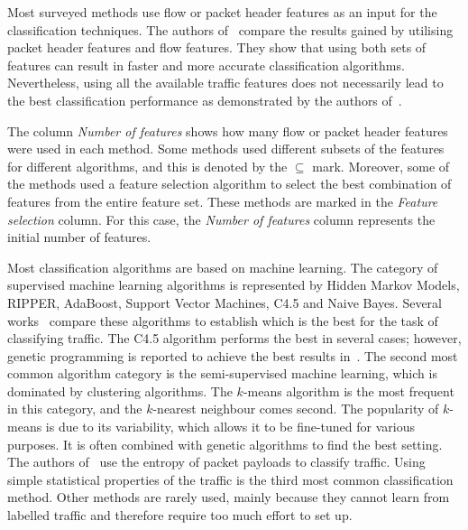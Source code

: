 Most surveyed methods use flow or packet header features as an input for the classification techniques. The authors of~\cite{Alshammari-2009-Preliminary, Alshammari-2011-Can} compare the results gained by utilising packet header features and flow features. They show that using both sets of features can result in faster and more accurate classification algorithms. Nevertheless, using all the available traffic features does not necessarily lead to the best classification performance as demonstrated by the authors of~\cite{Alshammari-2009-Classifying}.

The column \emph{Number of features} shows how many flow or packet header features were used in each method. Some methods used different subsets of the features for different algorithms, and this is denoted by the $\subseteq$ mark. Moreover, some of the methods used a feature selection algorithm to select the best combination of features from the entire feature set. These methods are marked in the \emph{Feature selection} column. For this case, the \emph{Number of features} column represents the initial number of features.

Most classification algorithms are based on machine learning. The category of supervised machine learning algorithms is represented by Hidden Markov Models, RIPPER, AdaBoost, Support Vector Machines, C4.5 and Naive Bayes. Several works~\cite{Alshammari-2007-flow, Alshammari-2009-Machine, Alshammari-2010-Investigation, Alshammari-2011-Can} compare these algorithms to establish which is the best for the task of classifying traffic. The C4.5 algorithm performs the best in several cases; however, genetic programming is reported to achieve the best results in~\cite{Alshammari-2011-Can}. The second most common algorithm category is the semi-supervised machine learning, which is dominated by clustering algorithms. The $k$-means algorithm is the most frequent in this category, and the $k$-nearest neighbour comes second. The popularity of $k$-means is due to its variability, which allows it to be fine-tuned for various purposes. It is often combined with genetic algorithms to find the best setting. The authors of~\cite{Wang-2011-Using, Khakpour-2013-Information} use the entropy of packet payloads to classify traffic. Using simple statistical properties of the traffic is the third most common classification method. Other methods are rarely used, mainly because they cannot learn from labelled traffic and therefore require too much effort to set up.

